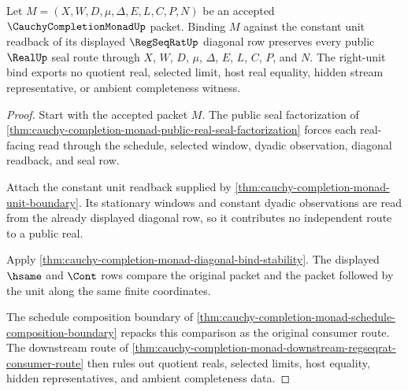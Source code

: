 \begin{theorem}
\label{thm:cauchy-completion-monad-right-unit-law}
Let $M=(X,W,D,\mu,\Delta,E,L,C,P,N)$ be an accepted $\CauchyCompletionMonadUp$ packet. Binding $M$ against the constant unit readback of its displayed $\RegSeqRatUp$ diagonal row preserves every public $\RealUp$ seal route through $X$, $W$, $D$, $\mu$, $\Delta$, $E$, $L$, $C$, $P$, and $N$. The right-unit bind exports no quotient real, selected limit, host real equality, hidden stream representative, or ambient completeness witness.
\end{theorem}
\begin{proof}
Start with the accepted packet $M$. The public seal factorization of \autoref{thm:cauchy-completion-monad-public-real-seal-factorization} forces each real-facing read through the schedule, selected window, dyadic observation, diagonal readback, and seal row.

Attach the constant unit readback supplied by \autoref{thm:cauchy-completion-monad-unit-boundary}. Its stationary windows and constant dyadic observations are read from the already displayed diagonal row, so it contributes no independent route to a public real.

Apply \autoref{thm:cauchy-completion-monad-diagonal-bind-stability}. The displayed $\hsame$ and $\Cont$ rows compare the original packet and the packet followed by the unit along the same finite coordinates.

The schedule composition boundary of \autoref{thm:cauchy-completion-monad-schedule-composition-boundary} repacks this comparison as the original consumer route. The downstream route of \autoref{thm:cauchy-completion-monad-downstream-regseqrat-consumer-route} then rules out quotient reals, selected limits, host equality, hidden representatives, and ambient completeness data.
\end{proof}

